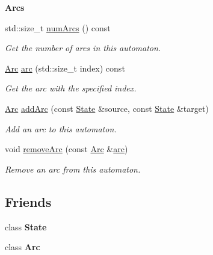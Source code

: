 \begin{Indent}{\bf \-Arcs}\par
\begin{DoxyCompactItemize}
\item 
std\-::size\-\_\-t \hyperlink{class_finite_automaton_acfb7910d6e4b504f09849704d3ef07aa}{num\-Arcs} () const 
\begin{DoxyCompactList}\small\item\em \-Get the number of arcs in this automaton. \end{DoxyCompactList}\item 
\hyperlink{class_arc}{\-Arc} \hyperlink{class_finite_automaton_a992512615cab32d1eadab430f38548de}{arc} (std\-::size\-\_\-t index) const 
\begin{DoxyCompactList}\small\item\em \-Get the arc with the specified {\ttfamily index}. \end{DoxyCompactList}\item 
\hyperlink{class_arc}{\-Arc} \hyperlink{class_finite_automaton_a2001b94911ee4e35c35c408c2fb2c089}{add\-Arc} (const \hyperlink{class_state}{\-State} \&source, const \hyperlink{class_state}{\-State} \&target)
\begin{DoxyCompactList}\small\item\em \-Add an arc to this automaton. \end{DoxyCompactList}\item 
void \hyperlink{class_finite_automaton_ad445bfea4e6183be2ee6f42ff60127d0}{remove\-Arc} (const \hyperlink{class_arc}{\-Arc} \&\hyperlink{class_finite_automaton_a992512615cab32d1eadab430f38548de}{arc})
\begin{DoxyCompactList}\small\item\em \-Remove an arc from this automaton. \end{DoxyCompactList}\end{DoxyCompactItemize}
\end{Indent}
\subsection*{\-Friends}
\begin{DoxyCompactItemize}
\item 
\hypertarget{class_finite_automaton_a7edbf9e31116a21e4e18cd2dd004ae63}{class {\bfseries \-State}}\label{class_finite_automaton_a7edbf9e31116a21e4e18cd2dd004ae63}

\item 
\hypertarget{class_finite_automaton_a462202165d679218de86391de27ab20c}{class {\bfseries \-Arc}}\label{class_finite_automaton_a462202165d679218de86391de27ab20c}

\end{DoxyCompactItemize}


